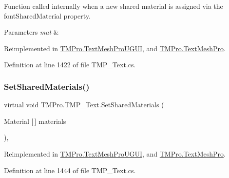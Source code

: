 Function called internally when a new shared material is assigned via the font\+Shared\+Material property. 


\begin{DoxyParams}{Parameters}
{\em mat} & \\
\hline
\end{DoxyParams}


Reimplemented in \mbox{\hyperlink{class_t_m_pro_1_1_text_mesh_pro_u_g_u_i_a37642717b05a3ef8cb0eaa004b2f00bc}{T\+M\+Pro.\+Text\+Mesh\+Pro\+U\+G\+UI}}, and \mbox{\hyperlink{class_t_m_pro_1_1_text_mesh_pro_a50256541f1e533a8fd3fd4b7830936d8}{T\+M\+Pro.\+Text\+Mesh\+Pro}}.



Definition at line 1422 of file T\+M\+P\+\_\+\+Text.\+cs.

\mbox{\label{class_t_m_pro_1_1_t_m_p___text_abd5a99f8e985bc1808f4dee6b268c7e1}} 
\subsubsection{\texorpdfstring{SetSharedMaterials()}{SetSharedMaterials()}}
{\footnotesize\ttfamily virtual void T\+M\+Pro.\+T\+M\+P\+\_\+\+Text.\+Set\+Shared\+Materials (\begin{DoxyParamCaption}\item[{Material \mbox{[}$\,$\mbox{]}}]{materials }\end{DoxyParamCaption})\hspace{0.3cm}{\ttfamily [protected]}, {\ttfamily [virtual]}}







Reimplemented in \mbox{\hyperlink{class_t_m_pro_1_1_text_mesh_pro_u_g_u_i_a9ca66d291221a6ee6a9aeaf7944a647d}{T\+M\+Pro.\+Text\+Mesh\+Pro\+U\+G\+UI}}, and \mbox{\hyperlink{class_t_m_pro_1_1_text_mesh_pro_a3d7d7fcab89d108d86a0bb463604267d}{T\+M\+Pro.\+Text\+Mesh\+Pro}}.



Definition at line 1444 of file T\+M\+P\+\_\+\+Text.\+cs.

\mbox{\label{class_t_m_pro_1_1_t_m_p___text_a8aebc83540d494fd574a92470762fdaa}} 
